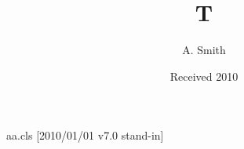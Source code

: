 \begin{filecontents*}[overwrite]{aa.cls}
[2010/01/01 v7.0 stand-in]
\def\mailname{{\it Correspondence to\/}:}
\def\email#1{{e-mail: \tt#1}}
\def\institute#1{\gdef\@institute{#1}}\def\@institute{}
\def\mail#1{\gdef\@mail{#1}}\def\@mail{}
\def\@maketitle{{\Large\@title\par}\@author\par\@institute\par
  \if!\@mail!\else\footnotetext[0]{\mailname\ \ignorespaces\@mail}\fi}
\end{filecontents*}
\documentclass{aa}
\usepackage{hyperref}

\title{T}\author{A. Smith}\date{Received 2010}
\maketitle
Body.

